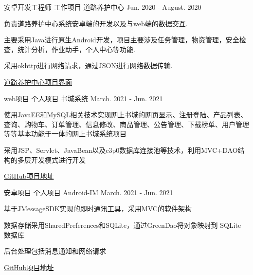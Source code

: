 

\begin{cventries}

  \cventry
    {安卓开发工程师} %
    {工作项目} %
    {道路养护中心} %
    {Jun. 2020 - August. 2020} %
    {
      \begin{cvitems} %
        \item {负责道路养护中心系统安卓端的开发以及与web端的数据交互.}
        \item {主要采用Java进行原生Android开发，项目主要涉及任务管理，物资管理，安全检查，统计分析，作业助手，个人中心等功能.}
        \item {采用okhttp进行网络请求，通过JSON进行网络数据传输.}
        \item {\href{https://org.modao.cc/app/255ca15c8c6f06add68dad7743ee69a509f3be46}{道路养护中心项目界面}}
      \end{cvitems}
    }

  \cventry
    {web项目} %
    {个人项目} %
    {书城系统} %
    {March. 2021 - Jun. 2021} %
    {
      \begin{cvitems} %
        \item {使用JavaEE和MySQL相关技术实现网上书城的网页显示、注册登陆、产品列表、查询、购物车、订单管理、信息修改、商品管理、公告管理、下载榜单、用户管理等等基本功能于一体的网上书城系统项目}
        \item {采用JSP、Servlet、JavaBean以及c3p0数据库连接池等技术，利用MVC+DAO结构的多层开发模式进行开发}
        \item {\href{https://github.com/zhoudexi/BookStore}{GitHub项目地址}}
      \end{cvitems}
    }

  \cventry
    {安卓项目} %
    {个人项目} %
    {Android-IM} %
    {March. 2021 - Jun. 2021} %
    {
      \begin{cvitems} %
        \item {基于JMessageSDK实现的即时通讯工具，采用MVC的软件架构}
        \item {数据存储采用SharedPreferences和SQLite，通过GreenDao将对象映射到 SQLite 数据库}
        \item {后台处理包括消息通知和网络请求}
        \item {\href{https://github.com/zhoudexi/Android-IM}{GitHub项目地址}}
      \end{cvitems}
    }


\end{cventries}
